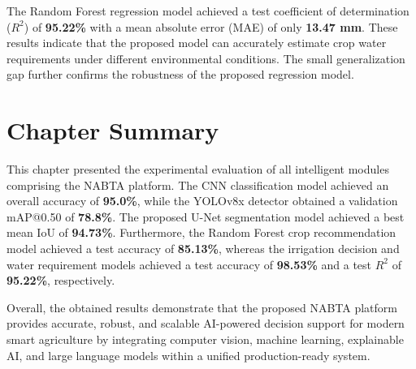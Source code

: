 The Random Forest regression model achieved a test coefficient of determination ($R^2$) of \textbf{95.22\%} with a mean absolute error (MAE) of only \textbf{13.47 mm}. These results indicate that the proposed model can accurately estimate crop water requirements under different environmental conditions. The small generalization gap further confirms the robustness of the proposed regression model.

\section{Chapter Summary}

This chapter presented the experimental evaluation of all intelligent modules comprising the NABTA platform. The CNN classification model achieved an overall accuracy of \textbf{95.0\%}, while the YOLOv8x detector obtained a validation mAP@0.50 of \textbf{78.8\%}. The proposed U-Net segmentation model achieved a best mean IoU of \textbf{94.73\%}. Furthermore, the Random Forest crop recommendation model achieved a test accuracy of \textbf{85.13\%}, whereas the irrigation decision and water requirement models achieved a test accuracy of \textbf{98.53\%} and a test $R^2$ of \textbf{95.22\%}, respectively.

Overall, the obtained results demonstrate that the proposed NABTA platform provides accurate, robust, and scalable AI-powered decision support for modern smart agriculture by integrating computer vision, machine learning, explainable AI, and large language models within a unified production-ready system.
